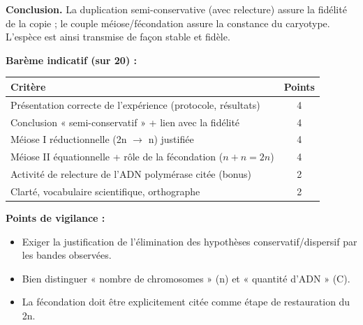 \documentclass[11pt]{article}
\begin{document}
\begin{corrige}
\textbf{Conclusion.} La duplication semi-conservative (avec relecture) assure la fidélité de la copie ; le couple méiose/fécondation assure la constance du caryotype. L'espèce est ainsi transmise de façon stable et fidèle.

\textbf{Barème indicatif (sur 20) :}
\begin{center}
\begin{tabular}{|l|c|}\hline
\rowcolor{popblueL} \textbf{Critère} & \textbf{Points} \\ \hline
Présentation correcte de l'expérience (protocole, résultats) & 4 \\ \hline
Conclusion « semi-conservatif » + lien avec la fidélité & 4 \\ \hline
Méiose I réductionnelle (2n $\to$ n) justifiée & 4 \\ \hline
Méiose II équationnelle + rôle de la fécondation ($n+n=2n$) & 4 \\ \hline
Activité de relecture de l'ADN polymérase citée (bonus) & 2 \\ \hline
Clarté, vocabulaire scientifique, orthographe & 2 \\ \hline
\end{tabular}
\end{center}

\textbf{Points de vigilance :}
\begin{itemize}
    \item Exiger la justification de l'élimination des hypothèses conservatif/dispersif par les bandes observées.
    \item Bien distinguer « nombre de chromosomes » (n) et « quantité d'ADN » (C).
    \item La fécondation doit être explicitement citée comme étape de restauration du 2n.
\end{itemize}
\end{corrige}
\end{document}
